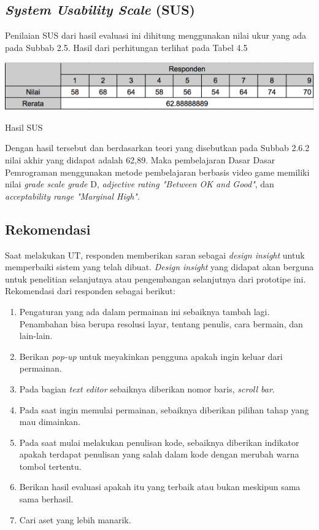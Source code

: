 	\subsection{\textit{System Usability Scale} (SUS)}
	Penilaian SUS dari hasil evaluasi ini dihitung menggunakan nilai ukur yang ada pada Subbab 2.5. Hasil dari perhitungan terlihat pada Tabel 4.5
	\begin{table}
		\includegraphics[width=\linewidth]{pics/hasil-sus}
		\caption{Hasil SUS}
		\centering
	\end{table}
	Dengan hasil tersebut dan berdasarkan teori yang disebutkan pada Subbab 2.6.2 nilai akhir yang didapat adalah 62,89. Maka pembelajaran Dasar Dasar Pemrograman menggunakan metode pembelajaran berbasis video game memiliki nilai \textit{grade scale grade} D, \textit{adjective rating "Between OK and Good"}, dan \textit{acceptability range "Marginal High"}.
	
	\subsection{Rekomendasi}
	Saat melakukan UT, responden memberikan saran sebagai \textit{design insight} untuk memperbaiki sistem yang telah dibuat. \textit{Design insight} yang didapat akan berguna untuk penelitian selanjutnya atau pengembangan selanjutnya dari prototipe ini. Rekomendasi dari responden sebagai berikut:
	\begin{enumerate}
		\item Pengaturan yang ada dalam permainan ini sebaiknya tambah lagi. Penambahan bisa berupa resolusi layar, tentang penulis, cara bermain, dan lain-lain.
		\item Berikan \textit{pop-up} untuk meyakinkan pengguna apakah ingin keluar dari permainan.
		\item Pada bagian \textit{text editor} sebaiknya diberikan nomor baris, \textit{scroll bar}.
		\item Pada saat ingin memulai permainan, sebaiknya diberikan pilihan tahap yang mau dimainkan.
		\item Pada saat mulai melakukan penulisan kode, sebaiknya diberikan indikator apakah terdapat penulisan yang salah dalam kode dengan merubah warna tombol tertentu.
		\item Berikan hasil evaluasi apakah itu yang terbaik atau bukan meskipun sama sama berhasil.
		\item Cari aset yang lebih manarik.
	\end{enumerate}
	